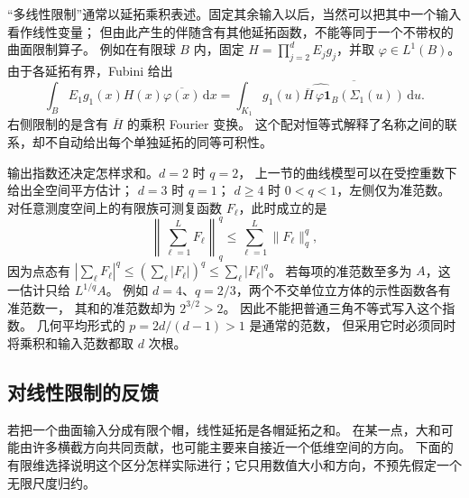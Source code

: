 \ProseParagraphBreak
“多线性限制”通常以延拓乘积表述。固定其余输入以后，当然可以把其中一个输入看作线性变量；
但由此产生的伴随含有其他延拓函数，不能等同于一个不带权的曲面限制算子。
例如在有限球 \(B\) 内，固定
\(H=\prod_{j=2}^dE_jg_j\)，并取 \(\varphi\in L^1(B)\)。
由于各延拓有界，Fubini 给出
\[
 \int_B E_1g_1(x)H(x)\overline{\varphi(x)}\,\mathrm dx
 =\int_{K_1}g_1(u)
 \overline{\widehat{\overline H\,\varphi\mathbf1_B}
 (\Sigma_1(u))}\,\mathrm du.
\]
右侧限制的是含有 \(\overline H\) 的乘积 Fourier 变换。
这个配对恒等式解释了名称之间的联系，却不自动给出每个单独延拓的同等可积性。

输出指数还决定怎样求和。\(d=2\) 时 \(q=2\)，
上一节的曲线模型可以在受控重数下给出全空间平方估计；
\(d=3\) 时 \(q=1\)；
\(d\geq4\) 时 \(0<q<1\)，左侧仅为准范数。
对任意测度空间上的有限族可测复函数 \(F_\ell\)，此时成立的是
\[
 \left\|\sum_{\ell=1}^L F_\ell\right\|_q^q
 \leq\sum_{\ell=1}^L\|F_\ell\|_q^q,
\]
因为点态有
\(|\sum_\ell F_\ell|^q\leq(\sum_\ell|F_\ell|)^q
\leq\sum_\ell|F_\ell|^q\)。
若每项的准范数至多为 \(A\)，这一估计只给 \(L^{1/q}A\)。
例如 \(d=4\)、\(q=2/3\)，两个不交单位立方体的示性函数各有准范数一，
其和的准范数却为 \(2^{3/2}>2\)。
因此不能把普通三角不等式写入这个指数。
几何平均形式的 \(p=2d/(d-1)>1\) 是通常的范数，
但采用它时必须同时将乘积和输入范数都取 \(d\) 次根。

\subsection{对线性限制的反馈}
\label{b2:subsec:250403}

若把一个曲面输入分成有限个帽，线性延拓是各帽延拓之和。
在某一点，大和可能由许多横截方向共同贡献，也可能主要来自接近一个低维空间的方向。
下面的有限维选择说明这个区分怎样实际进行；它只用数值大小和方向，不预先假定一个无限尺度归约。

